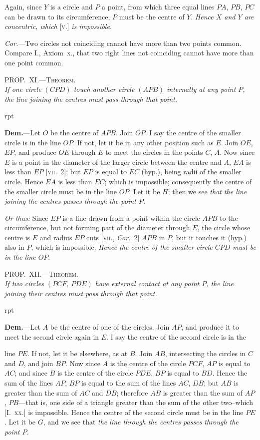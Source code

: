 \documentclass[oneside]{book}
\newcounter{wrapwidth}
\newcommand\myprop[2]{
\bigskip\Needspace*{4\baselineskip}\begin{center}\textsc{#1}\\\medskip\emph{#2}\par\end{center}
}
\newcommand\imgflow[3]{
\setcounter{wrapwidth}{#1}

\begin{wrapfigure}[#2]{r}{\value{wrapwidth}pt}
\begin{center}
\vspace{-0.3in}

\end{center}
\end{wrapfigure}
}
\begin{document}
Again, since $Y$ is a circle and
$P$ a point, from which three equal
lines $PA$, $PB$, $PC$ can be drawn to its circumference,
$P$ must be the centre of $Y$. \emph{Hence $X$ and $Y$ are concentric,
which} [\textsc{v.}] \emph{is impossible.}

\emph{Cor.}---Two circles not coinciding cannot have more
than two points common. Compare I., Axiom~\textsc{x}., that
two right lines not coinciding cannot have more than
one point common.



\myprop{PROP\@.~XI\@.---Theorem.}{If one circle $(CPD)$ touch another circle $(APB)$ internally
at any point $P$, the line joining the centres must pass through that point.}


\imgflow{112}{10}{f114}

\textbf{Dem.}---Let $O$ be the centre of $APB$. Join $OP$. I
say the centre of the smaller
circle is in the line $OP$. If not,
let it be in any other position such
as $E$. Join $OE$, $EP$, and produce
$OE$ through $E$ to meet the circles
in the points $C$, $A$. Now since $E$
is a point in the diameter of the
larger circle between the centre
and $A$, $EA$ is less than $EP$
[\textsc{vii.}~2]; but $EP$ is equal to $EC$
(hyp.), being radii of the smaller circle. Hence $EA$
is less than $EC$; which is impossible; consequently the
centre of the smaller circle must be in the line $OP$.
Let it be $H$; then we see \textit{that the line joining the centres
passes through the point $P$.}

\textit{Or thus:} Since $EP$ is a line drawn from a point
within the circle $APB$ to the circumference, but not
forming part of the diameter through $E$, the circle
whose centre is $E$ and radius $EP$ cuts [\textsc{vii.}, \textit{Cor.}~2]
$APB$ in $P$, but it touches it (hyp.) also in $P$, which is
impossible. \textit{Hence the centre of the smaller circle $CPD$
must be in the line $OP$}.

\myprop{PROP\@.~XII\@.---Theorem.}{If two circles $(PCF,\ PDE)$ have external contact at any
point $P$, the line joining their centres must pass through
that point.}


\imgflow{150}{7}{f115}

\textbf{Dem.}---Let $A$ be the centre of one of the circles.
Join $AP$, and produce it to meet the second circle again
in $E$. I say the centre of the second circle is in the

line $PE$. If not, let it be elsewhere, as at $B$. Join
$AB$, intersecting the circles
in $C$ and $D$, and join $BP$.
Now since $A$ is the centre
of the circle $PCF$, $AP$ is
equal to $AC$; and since $B$
is the centre of the circle
$PDE$, $BP$ is equal to $BD$.
Hence the sum of the lines $AP$, $BP$ is equal to the
sum of the lines $AC$, $DB$; but $AB$ is greater than the
sum of $AC$ and $DB$; therefore $AB$ is greater than the
sum of $AP$, $PB$---that is, one side of a triangle greater
than the sum of the other two--which [I.~\textsc{xx.}] is impossible.
Hence the centre of the second circle must be
in the line $PE$. Let it be $G$, and we see that \textit{the line
through the centres passes through the point $P$.}
\end{document}
